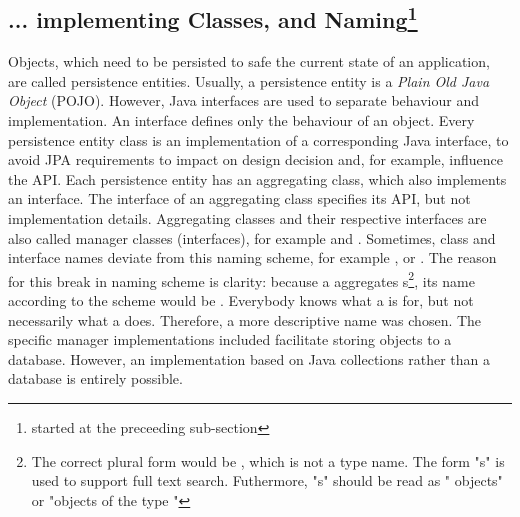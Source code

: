 \subsection{... implementing Classes, and Naming\protect\footnote{started at the preceeding sub-section}}
Objects, which need to be persisted to safe the current state of an application, are called persistence entities.
Usually, a persistence entity is a \textit{Plain Old Java Object} (POJO).
However, Java interfaces are used to separate behaviour and implementation.
An interface defines only the behaviour of an object.
Every persistence entity class is an implementation of a corresponding Java interface, to avoid JPA requirements to impact on design decision and, for example, influence the \salespoint{} API.
Each persistence entity has an aggregating class, which also implements an interface.
The interface of an aggregating class specifies its API, but not implementation details.
Aggregating classes and their respective interfaces are also called manager classes (interfaces), for example  and .
Sometimes, class and interface names deviate from this naming scheme, for example ,  or .
The reason for this break in naming scheme is clarity: because a  aggregates s\footnote{
	The correct plural form would be , which is not a type name.
	The form "s" is used to support full text search.
	Futhermore, "s" should be read as " objects" or "objects of the type "},
its name according to the scheme would be .
Everybody knows what a  is for, but not necessarily what a  does.
Therefore, a more descriptive name was chosen.
The specific manager implementations included \salespoint{} facilitate storing objects to a database.
However, an implementation based on Java collections rather than a database is entirely possible.

